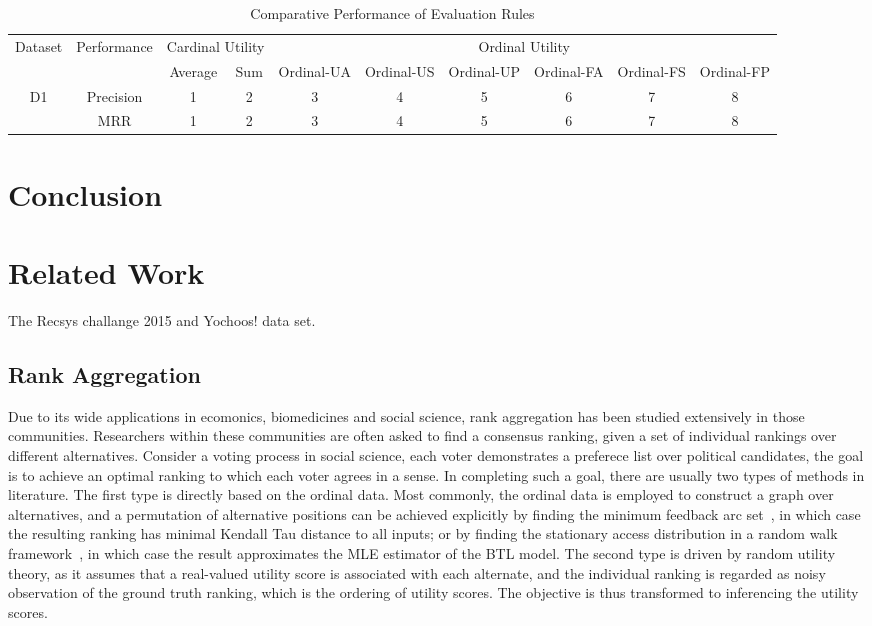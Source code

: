 \documentclass[sigconf]{acmart}
\begin{document}
\begin{table*}
\caption{Comparative Performance of Evaluation Rules }
\label{tab:decision}
\begin{tabular}{|c|c|c|c|c|c|c|c|c|c|}
\hline
\multirow{2}{*}{Dataset} & \multirow{2}{*}{Performance}
& \multicolumn{2}{|c|}{Cardinal Utility} & \multicolumn{6}{|c|}{Ordinal Utility} \\
\cline{3-10} & & Average & Sum & Ordinal-UA & Ordinal-US & Ordinal-UP & Ordinal-FA & Ordinal-FS & Ordinal-FP \\\hline
\multirow{2}{*}{D1} & Precision & 1 & 2 & 3 & 4 & 5 & 6 & 7 & 8 \\
\cline{2-10} & MRR & 1 & 2 &3 & 4 & 5 &6 & 7 & 8
\\ \hline \end{tabular}
\end{table*}


\section{Conclusion}\label{sec:conclusion}


\section{Related Work}\label{sec:relatedwork}
The Recsys challange 2015 and Yochoos! data set.


\subsection{Rank Aggregation}
Due to its wide applications in ecomonics, biomedicines and social science, rank aggregation has been studied extensively in those communities. Researchers within these communities are often asked to find a consensus ranking, given a set of individual rankings over different alternatives. Consider a voting process in social science, each voter demonstrates a preferece list over political candidates, the goal is to achieve an optimal ranking to which each voter agrees in a sense.  In completing such a goal, there are usually two types of methods in literature. The first type is directly based on the ordinal data. Most commonly, the ordinal data is employed to construct a graph over alternatives, and a permutation of alternative positions can be achieved explicitly by finding the minimum feedback arc set~\cite{Alon2006Ranking}, in which case the resulting ranking has minimal Kendall Tau distance to all inputs; or by finding the stationary access distribution in a random walk framework~\cite{Negahban2012Iterative}, in which case the result approximates the MLE estimator of the BTL model. The second type is driven by random utility theory, as it assumes that a real-valued utility score is associated with each alternate, and the individual ranking is regarded as noisy observation of the ground truth ranking, which is the ordering of utility scores. The objective is thus transformed to inferencing the utility scores.         
\end{document}
